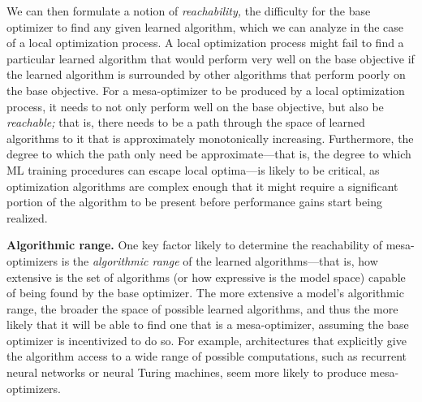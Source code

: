 \documentclass[
  onecolumn,
  natbib,
]{miri-tech-article}
\begin{document}
We can then formulate a notion of \textit{reachability,} the difficulty for the base optimizer to find any given learned algorithm, which we can analyze in the case of a local optimization process. A local optimization process might fail to find a particular learned algorithm that would perform very well on the base objective if the learned algorithm is surrounded by other algorithms that perform poorly on the base objective. For a mesa-optimizer to be produced by a local optimization process, it needs to not only perform well on the base objective, but also be \textit{reachable;} that is, there needs to be a path through the space of learned algorithms to it that is approximately monotonically increasing. Furthermore, the degree to which the path only need be approximate---that is, the degree to which ML training procedures can escape local optima---is likely to be critical, as optimization algorithms are complex enough that it might require a significant portion of the algorithm to be present before performance gains start being realized.

\textbf{Algorithmic range.} One key factor likely to determine the reachability of mesa-optimizers is the \textit{algorithmic range} of the learned algorithms---that is, how extensive is the set of algorithms (or how expressive is the model space) capable of being found by the base optimizer. The more extensive a model's algorithmic range, the broader the space of possible learned algorithms, and thus the more likely that it will be able to find one that is a mesa-optimizer, assuming the base optimizer is incentivized to do so. For example, architectures that explicitly give the algorithm access to a wide range of possible computations, such as recurrent neural networks or neural Turing machines,\cite{neural_tms} seem more likely to produce mesa-optimizers.
\end{document}
